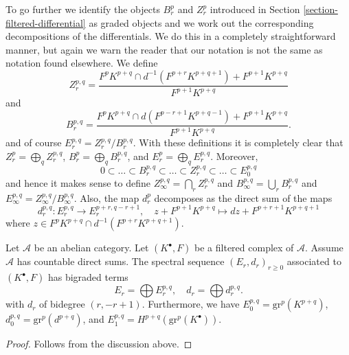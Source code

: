 \medskip\noindent
To go further we identify the objects $B_r^p$ and $Z_r^p$ introduced
in Section \ref{section-filtered-differential} as graded objects and
we work out the corresponding decompositions of the differentials.
We do this in a completely straightforward manner, but again we warn
the reader that our notation is not the same as notation found
elsewhere. We define
$$
Z_r^{p, q} =
\frac{F^pK^{p + q} \cap d^{-1}(F^{p + r}K^{p + q + 1}) + F^{p + 1}K^{p + q}}
{F^{p + 1}K^{p + q}}
$$
and
$$
B_r^{p, q} =
\frac{F^pK^{p + q} \cap d(F^{p - r + 1}K^{p + q - 1}) + F^{p + 1}K^{p + q}}
{F^{p + 1}K^{p + q}}.
$$
and of course $E_r^{p, q} = Z_r^{p, q}/B_r^{p, q}$.
With these definitions it is completely clear that
$Z_r^p = \bigoplus_q Z_r^{p, q}$,
$B_r^p = \bigoplus_q B_r^{p, q}$, and
$E_r^p = \bigoplus_q E_r^{p, q}$. Moreover,
$$
0 \subset \ldots \subset B_r^{p, q} \subset
\ldots
\subset Z_r^{p, q} \subset \ldots \subset E_0^{p, q}
$$
and hence it makes sense to define $Z_\infty^{p, q} = \bigcap_r Z_r^{p, q}$
and $B_\infty^{p, q} = \bigcup_r B_r^{p, q}$ and
$E_\infty^{p, q} = Z_\infty^{p, q}/B_\infty^{p, q}$.
Also, the map $d_r^p$ decomposes as the direct sum of the maps
$$
d_r^{p, q} : E_r^{p, q} \longrightarrow E_r^{p + r, q - r + 1},
\quad
z + F^{p + 1}K^{p + q}
\mapsto
dz + F^{p + r + 1}K^{p + q + 1}
$$
where $z \in F^pK^{p + q} \cap d^{-1}(F^{p + r}K^{p + q + 1})$.

\begin{lemma}
\label{lemma-spectral-sequence-filtered-complex}
Let $\mathcal{A}$ be an abelian category.
Let $(K^\bullet, F)$ be a filtered complex of $\mathcal{A}$.
Assume $\mathcal{A}$ has countable direct sums.
The spectral sequence $(E_r, d_r)_{r \geq 0}$
associated to $(K^\bullet, F)$ has bigraded terms
$$
E_r = \bigoplus E_r^{p, q},
\quad
d_r = \bigoplus d_r^{p, q}.
$$
with $d_r$ of bidegree $(r, - r + 1)$.
Furthermore, we have
$E_0^{p, q} = \text{gr}^p(K^{p + q})$,
$d_0^{p, q} = \text{gr}^p(d^{p + q})$,
and $E_1^{p, q} = H^{p + q}(\text{gr}^p(K^\bullet))$.
\end{lemma}

\begin{proof}
Follows from the discussion above.
\end{proof}

